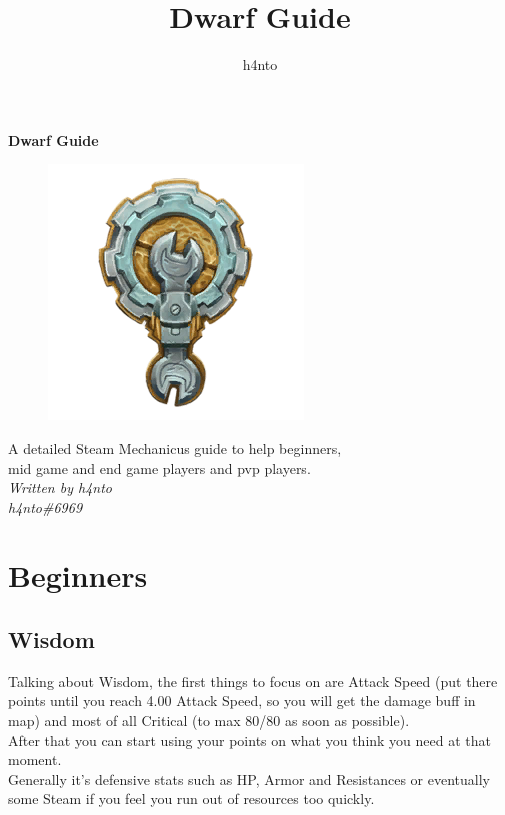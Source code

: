 \documentclass[12pt]{article}
\title{Dwarf Guide}
\author{h4nto}
\begin{document}

\begin{center}
    \vspace*{\fill}
    \Huge\textbf{Dwarf Guide} \\
    \begin{figure}[h]
        \includegraphics{dwarf.png}
        \centering
    \end{figure}
    \vspace*{\fill}
    \normalsize{A detailed Steam Mechanicus guide to help beginners,\\mid game and end game players and pvp players.} \\
    \vspace*{\fill}
    \Large\textsl{Written by h4nto} \\
    \Large\textsl{h4nto\#6969}
    \vspace*{\fill}
\end{center}

\newpage


\tableofcontents

\newpage


\section{Beginners}

\subsection{Wisdom}
Talking about Wisdom, the first things to focus on are Attack Speed (put there points until you reach 4.00 Attack Speed, so you will get the damage buff in map) and most of all Critical (to max 80/80 as soon as possible). \\
After that you can start using your points on what you think you need at that moment. \\
Generally it's defensive stats such as HP, Armor and Resistances or eventually some Steam if you feel you run out of resources too quickly.
\end{document}
